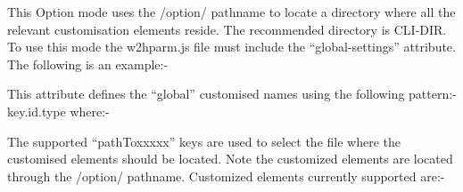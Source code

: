 \documentclass[letterpaper,10pt,english]{sphinxmanual}
\begin{document}

This Option mode uses the /option/ pathname to locate a directory where all the relevant customisation elements reside. The recommended directory is CLI-DIR. To use this mode the w2hparm.js file must include the “global-settings” attribute. The following is an example:-

\begin{sphinxVerbatim}[commandchars=\\\{\}]
     
     
\end{sphinxVerbatim}

This attribute defines the “global” customised names using the following pattern:- key.id.type where:-

\begin{sphinxVerbatim}[commandchars=\\\{\}]
                
           
           
\end{sphinxVerbatim}

The supported “pathToxxxxx” keys are used to select the file where the customised elements should be located. Note the customized elements are located through the /option/ pathname. Customized elements currently supported are:-

\begin{sphinxVerbatim}[commandchars=\\\{\}]
       
        
         
         
            
\end{sphinxVerbatim}
\end{document}
